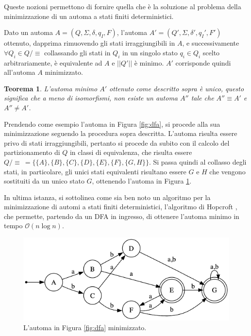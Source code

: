 \documentclass[a4paper,12pt]{report} %
\newcommand{\partitioned}[2]{#1\slash\!\!#2}  %
\newcommand{\bigo}[0]{\mathcal{O}}            %
\newtheorem{theorem}{Teorema}[chapter]        %
\begin{document}
Queste nozioni permettono di fornire quella che è la soluzione al problema della minimizzazione di un automa a
stati finiti deterministici.

Dato un automa $A = (Q, \Sigma, \delta, q_I, F)$, l'automa $A' = (Q', \Sigma, \delta', q_I', F')$ ottenuto, dapprima
rimuovendo gli stati irraggiungibili in $A$, e successivamente $\forall Q_i \in \partitioned{Q}{\equiv}$ collassando gli stati
in $Q_i$ in un singolo stato $q_i \in Q_i$ scelto arbitrariamente, è equivalente ad $A$ e $||Q'||$ è minimo.
$A'$ corrisponde quindi all'automa $A$ minimizzato.

\begin{theorem}
  \label{th:unique-min-dfa}
  L'automa minimo $A'$ ottenuto come descritto sopra è unico, questo significa che a meno di isomorfismi,
  non esiste un automa $A''$ tale che $A'' \equiv A'$ e $A'' \neq A'$.
\end{theorem}

Prendendo come esempio l'automa in Figura \ref{fig:dfa}, si procede alla sua minimizzazione seguendo
la procedura sopra descritta. L'automa risulta essere privo di stati irraggiungibili,
pertanto si procede da subito con il calcolo del partizionamento di $Q$ in classi di equivalenza,
che risulta essere
$\partitioned{Q}{\equiv} \ = \{ \{A\}, \{B\}, \{C\}, \{D\}, \{E\}, \{F\}, \{G, H\}\}$.
Si passa quindi al collasso degli stati, in particolare, gli unici stati equivalenti risultano essere
$G$ e $H$ che vengono sostituiti da un unico stato $G$, ottenendo l'automa in Figura \ref{fig:minified-dfa}.

In ultima istanza, si sottolinea come sia ben noto un algoritmo per la minimizzazione di automi a stati 
finiti deterministici, l'algoritmo di Hopcroft \parencite{Hop71}, che permette, partendo da un DFA in ingresso, 
di ottenere l'automa minimo in tempo $\bigo(n \log n)$.

\begin{figure}[!htb]
  \centering
  \includegraphics[width=0.7\linewidth]{images/minified_dfa.png}
  \caption{\label{fig:minified-dfa}L'automa in Figura \ref{fig:dfa} minimizzato.}
\end{figure}
\end{document}
